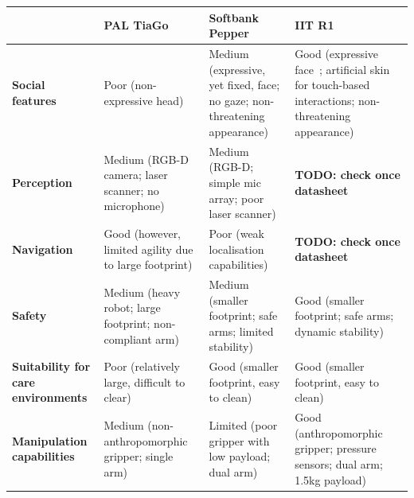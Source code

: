 \documentclass[11pt,a4paper]{report}
\newcommand{\TODO}[1]{{\color{red}\textbf{TODO: #1}}}
\begin{document}
\begin{table}[]
    \begin{tabular}{@{}p{3cm}p{5cm}p{5cm}p{5cm}@{}}
\toprule
                                           & PAL TiaGo                                                & Softbank Pepper                                                           & \textbf{IIT R1}                                                                                                                              \\ \midrule
\textbf{Social features}                   & Poor (non-expressive head)                               & Medium (expressive, yet fixed, face; no gaze; non-threatening appearance) & Good (expressive face~\cite{lehman2016head}; artificial skin for touch-based interactions; non-threatening appearance) \\
\textbf{Perception}                        & Medium (RGB-D camera; laser scanner; no microphone)      & Medium (RGB-D; simple mic array; poor laser scanner)                      & \TODO{check once datasheet}                                                                                                   \\
\textbf{Navigation}                        & Good (however, limited agility due to large footprint)   & Poor (weak localisation capabilities)                                     & \TODO{check once datasheet}                                                                                                   \\
\textbf{Safety}                            & Medium (heavy robot; large footprint; non-compliant arm) & Medium (smaller footprint; safe arms; limited stability)                  & Good (smaller footprint; safe arms; dynamic stability)                                                                                       \\
\textbf{Suitability for care environments} & Poor (relatively large, difficult to clear)              & Good (smaller footprint, easy to clean)                                   & Good (smaller footprint, easy to clean)                                                                                                      \\
\textbf{Manipulation capabilities}         & Medium (non-anthropomorphic gripper; single arm)         & Limited (poor gripper with low payload; dual arm)                         & Good (anthropomorphic gripper; pressure sensors; dual arm; 1.5kg payload)                                                                    \\ \bottomrule
\end{tabular}
    \label{robot-comparison}
\end{table}
\end{document}
